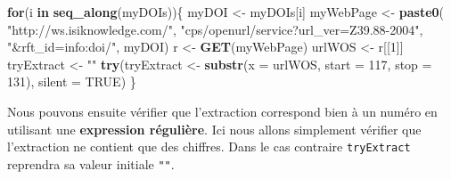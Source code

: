\documentclass[]{book}
\newenvironment{Shaded}{\begin{snugshade}}{\end{snugshade}}
\newcommand{\ControlFlowTok}[1]{\textcolor[rgb]{0.13,0.29,0.53}{\textbf{#1}}}
\newcommand{\DataTypeTok}[1]{\textcolor[rgb]{0.13,0.29,0.53}{#1}}
\newcommand{\DecValTok}[1]{\textcolor[rgb]{0.00,0.00,0.81}{#1}}
\newcommand{\KeywordTok}[1]{\textcolor[rgb]{0.13,0.29,0.53}{\textbf{#1}}}
\newcommand{\NormalTok}[1]{#1}
\newcommand{\OperatorTok}[1]{\textcolor[rgb]{0.81,0.36,0.00}{\textbf{#1}}}
\newcommand{\OtherTok}[1]{\textcolor[rgb]{0.56,0.35,0.01}{#1}}
\newcommand{\StringTok}[1]{\textcolor[rgb]{0.31,0.60,0.02}{#1}}
\begin{document}
\begin{Shaded}
\begin{Highlighting}[]
\ControlFlowTok{for}\NormalTok{(i }\ControlFlowTok{in} \KeywordTok{seq_along}\NormalTok{(myDOIs))\{}
\NormalTok{  myDOI <-}\StringTok{ }\NormalTok{myDOIs[i]}
\NormalTok{  myWebPage <-}\StringTok{ }\KeywordTok{paste0}\NormalTok{(}
    \StringTok{"http://ws.isiknowledge.com/"}\NormalTok{, }
    \StringTok{"cps/openurl/service?url_ver=Z39.88-2004"}\NormalTok{, }
    \StringTok{"&rft_id=info:doi/"}\NormalTok{, myDOI)}
\NormalTok{  r <-}\StringTok{ }\KeywordTok{GET}\NormalTok{(myWebPage)}
\NormalTok{  urlWOS <-}\StringTok{ }\NormalTok{r[[}\DecValTok{1}\NormalTok{]]}
\NormalTok{  tryExtract <-}\StringTok{ ""}
  \KeywordTok{try}\NormalTok{(tryExtract <-}\StringTok{ }\KeywordTok{substr}\NormalTok{(}\DataTypeTok{x =}\NormalTok{ urlWOS, }\DataTypeTok{start =} \DecValTok{117}\NormalTok{, }\DataTypeTok{stop =} \DecValTok{131}\NormalTok{), }\DataTypeTok{silent =} \OtherTok{TRUE}\NormalTok{)}
\NormalTok{\}}
\end{Highlighting}
\end{Shaded}

Nous pouvons ensuite vérifier que l'extraction correspond bien à un numéro en utilisant une \textbf{expression régulière}. Ici nous allons simplement vérifier que l'extraction ne contient que des chiffres. Dans le cas contraire \texttt{tryExtract} reprendra sa valeur initiale \texttt{""}.

\begin{Shaded}
\end{Shaded}
\end{document}
